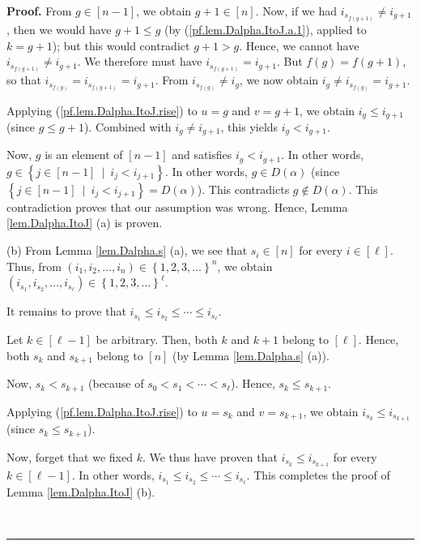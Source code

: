 \documentclass[numbers=enddot,12pt,final,onecolumn,notitlepage,abstracton]{scrartcl}
\theoremstyle{definition}
\newenvironment{proof}[1][Proof]{\noindent\textbf{#1.} }{\ \rule{0.5em}{0.5em}}
\newenvironment{verlong}{}{}
\begin{document}
\begin{verlong}
\begin{footnotesize}
\begin{proof}
From $g\in\left[  n-1\right]  $, we obtain $g+1\in\left[  n\right]  $. Now, if
we had $i_{s_{f\left(  g+1\right)  }}\neq i_{g+1}$, then we would have
$g+1\leq g$ (by (\ref{pf.lem.Dalpha.ItoJ.a.1}), applied to $k=g+1$); but this
would contradict $g+1>g$. Hence, we cannot have $i_{s_{f\left(  g+1\right)  }%
}\neq i_{g+1}$. We therefore must have $i_{s_{f\left(  g+1\right)  }}=i_{g+1}%
$. But $f\left(  g\right)  =f\left(  g+1\right)  $, so that $i_{s_{f\left(
g\right)  }}=i_{s_{f\left(  g+1\right)  }}=i_{g+1}$. From $i_{s_{f\left(
g\right)  }}\neq i_{g}$, we now obtain $i_{g}\neq i_{s_{f\left(  g\right)  }%
}=i_{g+1}$.

Applying (\ref{pf.lem.Dalpha.ItoJ.rise}) to $u=g$ and $v=g+1$, we obtain
$i_{g}\leq i_{g+1}$ (since $g\leq g+1$). Combined with $i_{g}\neq i_{g+1}$,
this yields $i_{g}<i_{g+1}$.

Now, $g$ is an element of $\left[  n-1\right]  $ and satisfies $i_{g}<i_{g+1}%
$. In other words, $g\in\left\{  j\in\left[  n-1\right]  \ \mid\ i_{j}%
<i_{j+1}\right\}  $. In other words, $g\in D\left(  \alpha\right)  $ (since
$\left\{  j\in\left[  n-1\right]  \ \mid\ i_{j}<i_{j+1}\right\}  =D\left(
\alpha\right)  $). This contradicts $g\notin D\left(  \alpha\right)  $. This
contradiction proves that our assumption was wrong. Hence, Lemma
\ref{lem.Dalpha.ItoJ} (a) is proven.

(b) From Lemma \ref{lem.Dalpha.s} (a), we see that $s_{i}\in\left[  n\right]
$ for every $i\in\left[  \ell\right]  $. Thus, from $\left(  i_{1}%
,i_{2},\ldots,i_{n}\right)  \in\left\{  1,2,3,\ldots\right\}  ^{n}$, we obtain
$\left(  i_{s_{1}},i_{s_{2}},\ldots,i_{s_{\ell}}\right)  \in\left\{
1,2,3,\ldots\right\}  ^{\ell}$.

It remains to prove that $i_{s_{1}}\leq i_{s_{2}}\leq\cdots\leq i_{s_{\ell}}$.

Let $k\in\left[  \ell-1\right]  $ be arbitrary. Then, both $k$ and $k+1$
belong to $\left[  \ell\right]  $. Hence, both $s_{k}$ and $s_{k+1}$ belong to
$\left[  n\right]  $ (by Lemma \ref{lem.Dalpha.s} (a)).

Now, $s_{k}<s_{k+1}$ (because of $s_{0}<s_{1}<\cdots<s_{\ell}$). Hence,
$s_{k}\leq s_{k+1}$.

Applying (\ref{pf.lem.Dalpha.ItoJ.rise}) to $u=s_{k}$ and $v=s_{k+1}$, we
obtain $i_{s_{k}}\leq i_{s_{k+1}}$ (since $s_{k}\leq s_{k+1}$).

Now, forget that we fixed $k$. We thus have proven that $i_{s_{k}}\leq
i_{s_{k+1}}$ for every $k\in\left[  \ell-1\right]  $. In other words,
$i_{s_{1}}\leq i_{s_{2}}\leq\cdots\leq i_{s_{\ell}}$. This completes the proof
of Lemma \ref{lem.Dalpha.ItoJ} (b).


\end{proof}
\end{footnotesize}
\end{verlong}
\end{document}
